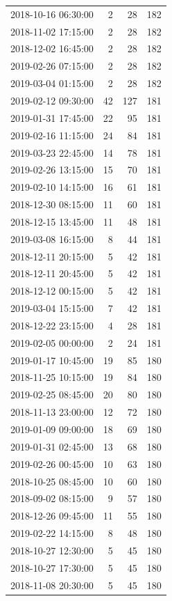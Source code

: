 \begin{tabular}{lrrr}
2018-10-16 06:30:00 & 2 & 28 & 182 \\
2018-11-02 17:15:00 & 2 & 28 & 182 \\
2018-12-02 16:45:00 & 2 & 28 & 182 \\
2019-02-26 07:15:00 & 2 & 28 & 182 \\
2019-03-04 01:15:00 & 2 & 28 & 182 \\
2019-02-12 09:30:00 & 42 & 127 & 181 \\
2019-01-31 17:45:00 & 22 & 95 & 181 \\
2019-02-16 11:15:00 & 24 & 84 & 181 \\
2019-03-23 22:45:00 & 14 & 78 & 181 \\
2019-02-26 13:15:00 & 15 & 70 & 181 \\
2019-02-10 14:15:00 & 16 & 61 & 181 \\
2018-12-30 08:15:00 & 11 & 60 & 181 \\
2018-12-15 13:45:00 & 11 & 48 & 181 \\
2019-03-08 16:15:00 & 8 & 44 & 181 \\
2018-12-11 20:15:00 & 5 & 42 & 181 \\
2018-12-11 20:45:00 & 5 & 42 & 181 \\
2018-12-12 00:15:00 & 5 & 42 & 181 \\
2019-03-04 15:15:00 & 7 & 42 & 181 \\
2018-12-22 23:15:00 & 4 & 28 & 181 \\
2019-02-05 00:00:00 & 2 & 24 & 181 \\
2019-01-17 10:45:00 & 19 & 85 & 180 \\
2018-11-25 10:15:00 & 19 & 84 & 180 \\
2019-02-25 08:45:00 & 20 & 80 & 180 \\
2018-11-13 23:00:00 & 12 & 72 & 180 \\
2019-01-09 09:00:00 & 18 & 69 & 180 \\
2019-01-31 02:45:00 & 13 & 68 & 180 \\
2019-02-26 00:45:00 & 10 & 63 & 180 \\
2018-10-25 08:45:00 & 10 & 60 & 180 \\
2018-09-02 08:15:00 & 9 & 57 & 180 \\
2018-12-26 09:45:00 & 11 & 55 & 180 \\
2019-02-22 14:15:00 & 8 & 48 & 180 \\
2018-10-27 12:30:00 & 5 & 45 & 180 \\
2018-10-27 17:30:00 & 5 & 45 & 180 \\
2018-11-08 20:30:00 & 5 & 45 & 180 \\

\end{tabular}
